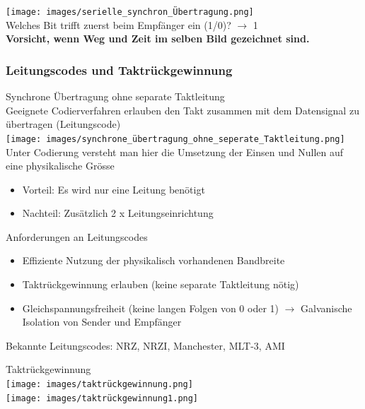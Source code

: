 \begin{example}
    \texttt{[image: images/serielle\_synchron\_Übertragung.png]}\\
    Welches Bit trifft zuerst beim Empfänger ein (1/0)? $\rightarrow$ 1\\
    \textbf{Vorsicht, wenn Weg und Zeit im selben Bild gezeichnet sind.}
\end{example}

\subsubsection{Leitungscodes und Taktrückgewinnung}

\begin{definition}{Synchrone Übertragung ohne separate Taktleitung}\\
    Geeignete Codierverfahren erlauben den Takt zusammen mit dem Datensignal zu übertragen (Leitungscode)\\
    \texttt{[image: images/synchrone\_übertragung\_ohne\_seperate\_Taktleitung.png]}\\
    Unter Codierung versteht man hier die Umsetzung der Einsen und Nullen auf eine physikalische Grösse
    \begin{itemize}
        \item Vorteil: Es wird nur eine Leitung benötigt
        \item Nachteil: Zusätzlich 2 x Leitungseinrichtung
    \end{itemize}
\end{definition}

\begin{KR}{Anforderungen an Leitungscodes}
\begin{itemize}
    \item Effiziente Nutzung der physikalisch vorhandenen Bandbreite
    \item Taktrückgewinnung erlauben (keine separate Taktleitung nötig)
    \item Gleichspannungsfreiheit (keine langen Folgen von 0 oder 1) $\rightarrow$ Galvanische Isolation von Sender und Empfänger
\end{itemize} 
\end{KR}

\begin{remark}
    Bekannte Leitungscodes: NRZ, NRZI, Manchester, MLT-3, AMI
\end{remark}

\begin{concept}{Taktrückgewinnung}\\
    \texttt{[image: images/taktrückgewinnung.png]}\\
    \texttt{[image: images/taktrückgewinnung1.png]}
\end{concept}





